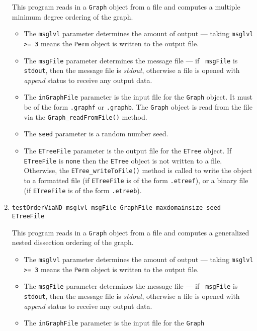 \begin{enumerate}
This program reads in a {\tt Graph} object from a file and computes
a multiple minimum degree ordering of the graph.
\par
\begin{itemize}
\item
The {\tt msglvl} parameter determines the amount of output ---
taking {\tt msglvl >= 3} means the {\tt Perm} object is written
to the output file.
\item
The {\tt msgFile} parameter determines the message file --- if {\tt
msgFile} is {\tt stdout}, then the message file is {\it stdout},
otherwise a file is opened with {\it append} status to receive any
output data.
\item
The {\tt inGraphFile} parameter is the input file for the {\tt Graph}
object. It must be of the form {\tt *.graphf} or {\tt *.graphb}.
The {\tt Graph} object is read from the file via the
{\tt Graph\_readFromFile()} method.
\item
The {\tt seed} parameter is a random number seed.
\item
The {\tt ETreeFile} parameter is the output file for the {\tt ETree}
object. 
If {\tt ETreeFile} is {\tt none} then the {\tt ETree} object is not
written to a file. 
Otherwise, the {\tt ETree\_writeToFile()} method is called to write
the object to 
a formatted file (if {\tt ETreeFile} is of the form {\tt *.etreef}),
or
a binary file (if {\tt ETreeFile} is of the form {\tt *.etreeb}).
\end{itemize}
\item
\begin{verbatim}
testOrderViaND msglvl msgFile GraphFile maxdomainsize seed ETreeFile
\end{verbatim}
This program reads in a {\tt Graph} object from a file and computes
a generalized nested dissection ordering of the graph.
\par
\begin{itemize}
\item
The {\tt msglvl} parameter determines the amount of output ---
taking {\tt msglvl >= 3} means the {\tt Perm} object is written
to the output file.
\item
The {\tt msgFile} parameter determines the message file --- if {\tt
msgFile} is {\tt stdout}, then the message file is {\it stdout},
otherwise a file is opened with {\it append} status to receive any
output data.
\item
The {\tt inGraphFile} parameter is the input file for the {\tt Graph}

\end{itemize}
\end{enumerate}
